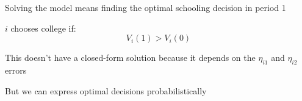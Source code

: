 \documentclass[aspectratio=169]{beamer}
\begin{document}
\begin{frame}
Solving the model means finding the optimal schooling decision in period 1
\bigskip{}
\bigskip{}
\bigskip{}

$i$ chooses college if:
$$V_i(1) > V_i(0)$$

\bigskip{}
\bigskip{}
\bigskip{}

This doesn't have a closed-form solution because it depends on the $\eta_{i1}$ and $\eta_{i2}$ errors

\bigskip{}
\bigskip{}
\bigskip{}

But we can express optimal decisions probabilistically

\end{frame}
\end{document}
